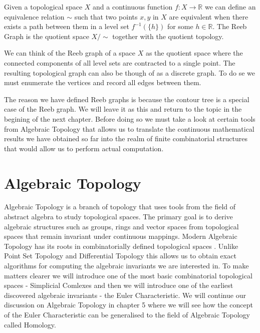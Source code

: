 \begin{defn}
Given a topological space $X$ and a continuous function $f: X \to \mathbb{R}$ we can define an equivalence relation $\sim$ such that two points $x, y$ in $X$ are equivalent when there exists a path between them in a level set $f^{-1}(\{h\})$ for some $h \in \mathbb{R}$. The Reeb Graph is the quotient space $X \big/ \sim$ together with the quotient topology.
\end{defn}

We can think of the Reeb graph of a space $X$ as the quotient space where the connected components of all level sets are contracted to a single point. The resulting topological graph can also be though of as a discrete graph. To do se we must enumerate the vertices and record all edges between them.

The reason we have defined Reeb graphs is because the contour tree is a special case of the Reeb graph. We will leave it as this and return to the topic in the begining of the next chapter. Before doing so we must take a look at certain tools from Algebraic Topology that allows us to translate the continuous mathematical results we have obtained so far into the realm of finite combinatorial structures that would allow us to perform actual computation.

\section{Algebraic Topology}

Algebraic Topology is a branch of topology that uses tools from the field of abstract algebra to study topological spaces. The primary goal is to derive algebraic structures such as groups, rings and vector spaces from topological spaces that remain invariant under continuous mappings. Modern Algebraic Topology has its roots in combinatorially defined topological spaces \cite{combinatorial-algebraic-topology}. Unlike Point Set Topology and Differential Topology this allows us to obtain exact algorithms for computing the algebraic invariants we are interested in. To make matters clearer we will introduce one of the most basic combinatorial topological spaces - Simplicial Comlexes and then we will introduce one of the earliest discovered algebraic invariants - the Euler Characteristic. We will continue our discussion on Algebraic Topology in chapter 5 where we will see how the concept of the Euler Characteristic can be generalised to the field of Algebraic Topology called Homology.

